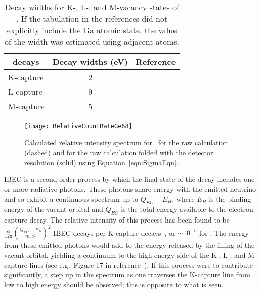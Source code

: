   	  	  	  	  		\begin{table}
	   	 	         		\centering
	   	 	         		\begin{tabular}{ l c r }
	   	 	         			\toprule
	   	 	         			\gersixeight~decays & Decay widths (eV) & Reference \\
	   	 	         			\midrule
	   	 	         			     K-capture & 2 &  \cite{Chen80}\\
	   	 	         			     L-capture & 9 &  \cite{Chen81}\\
	   	 	         			     M-capture & 5 &  \cite{McG72}\\
	   	 	         			\bottomrule
	   	 	         		\end{tabular}
	   	 	         		\caption[Decay widths for K-, L-, and M-vacancy states of \gersixeight]
	   	 	         		{Decay widths for K-, L-, and M-vacancy states of \gersixeight.  If the tabulation in the
							references did not explicitly include the Ga atomic state, the value of the width
							was estimated using adjacent atoms.}
	   	 	         		\label{tab:GE68DecayWidths}
	   	 	         	\end{table}	
						\begin{figure}
							\centering
							\texttt{[image: RelativeCountRateGe68]}
							\caption[Calculated relative intensity spectrum for \gersixeight.]
							{Calculated relative intensity spectrum for \gersixeight~for the raw calculation (dashed) and
							for the raw calculation folded with the detector resolution (solid) 
							using Equation~\ref{eqn:SigmaEqn}.}
							\label{fig:RelIntensityGe68}
						\end{figure}			

IBEC is a second-order process by which the final state of the decay includes one or more radiative photons.  
These photons share
energy with the emitted neutrino and so exhibit a continuous spectrum up to $Q_{EC} - E_H$, where $E_H$ is the binding energy
of the vacant orbital and $Q_{EC}$ is the total energy available to the electron-capture decay.  The relative intensity of this process  
has been found to be $\frac{\alpha}{12 \pi} (\frac{Q_{EC} - E_H}{m_e c^2})^2$ IBEC-decays-per-K-capture-decays~\cite{Morr40}, or
$\sim10^{-5}$ for \gersixeight.  The energy from these emitted photons
would add to the energy released by the filling of the vacant orbital, yielding a continuum to the high-energy
side of the K-, L-, and M-capture lines (see e.g.~Figure 17 in reference~\cite{DeRuj81}).  If this process were
to contribute significantly, a step up in the spectrum as one traverses the K-capture line from low to high energy
should be observed; this is opposite to what is seen.   
		
